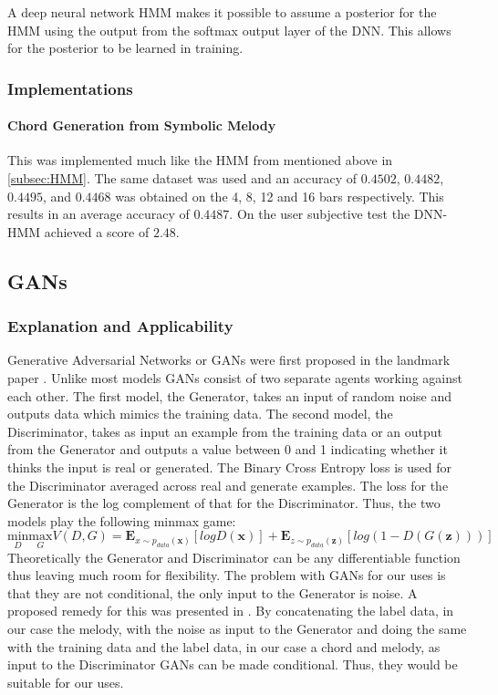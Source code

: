 A deep neural network HMM makes it possible to assume a posterior for the HMM using the output from the softmax output layer of the DNN. 
This allows for the posterior to be learned in training.

\subsubsection{Implementations}

\paragraph{Chord Generation from Symbolic Melody} This was implemented much like the HMM from \cite{BLSTM} mentioned above in \autoref{subsec:HMM}.
The same dataset was used and an accuracy of $0.4502$, $0.4482$, $0.4495$, and $0.4468$  was obtained on the 4, 8, 12 and 16 bars respectively. This results in an average accuracy of $0.4487$.
On the user subjective test the DNN-HMM achieved a score of $2.48$.

\subsection{GANs}

\subsubsection{Explanation and Applicability}

Generative Adversarial Networks or GANs were first proposed in the landmark paper \cite{GANs}. Unlike most models GANs consist of two separate agents working against each other.
The first model, the Generator, takes an input of random noise and outputs data which mimics the training data. 
The second model, the Discriminator, takes as input an example from the training data or an output from the Generator and outputs a value between 0 and 1 indicating whether it thinks the input is real or generated.
The Binary Cross Entropy loss is used for the Discriminator averaged across real and generate examples. The loss for the Generator is the log complement of that for the Discriminator. Thus, the two models play the following minmax game:
\begin{equation}
\underset{D}{\text{min}} \underset{G}{\text{max}} V(D,G) = \mathbf{E}_{x\sim p_{data}(\mathbf{x})}[logD(\mathbf{x})] + \mathbf{E}_{z\sim p_{data}(\mathbf{z})}[log(1-D(G(\mathbf{z})))]
\end{equation} 
Theoretically the Generator and Discriminator can be any differentiable function thus leaving much room for flexibility.
The problem with GANs for our uses is that they are not conditional, the only input to the Generator is noise. A proposed remedy for this was presented in \cite{CGANs}.
By concatenating the label data, in our case the melody, with the noise as input to the Generator and doing the same with the training data and the label data, in our case a chord and melody, as input to the Discriminator GANs can be made conditional. 
Thus, they would be suitable for our uses. 

